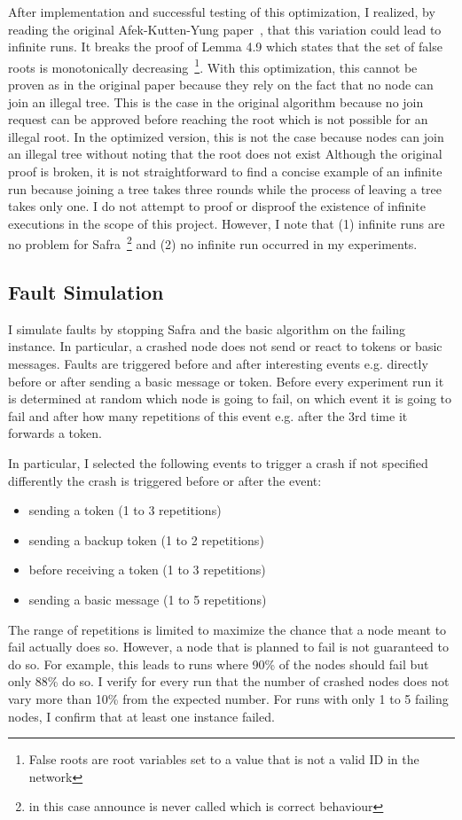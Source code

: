 After implementation and successful testing of this optimization, I realized, by reading the original Afek-Kutten-Yung paper~\cite{afek}, that this variation could lead to infinite runs.
It breaks the proof of Lemma 4.9 which states that the set of false roots is monotonically decreasing~\footnote{False roots are root variables set to a value that is not a valid ID in the network}.
With this optimization, this cannot be proven as in the original paper because they rely on the fact that no node can join an illegal tree.
This is the case in the original algorithm because no join request can be approved before reaching the root which is not possible for an illegal root.
In the optimized version, this is not the case because nodes can join an illegal tree without noting that the root does not exist
Although the original proof is broken, it is not straightforward to find a concise example of an infinite run because joining a tree takes three rounds while the process of leaving a tree takes only one.
I do not attempt to proof or disproof the existence of infinite executions in the scope of this project.
However, I note that (1) infinite runs are no problem for Safra~\footnote{in this case announce is never called which is correct behaviour} and (2) no infinite run occurred in my experiments.

\subsection{Fault Simulation}
I simulate faults by stopping Safra and the basic algorithm on the failing instance.
In particular, a crashed node does not send or react to tokens or basic messages.
Faults are triggered before and after interesting events e.g. directly before or after sending a basic message or token.
Before every experiment run it is determined at random which node is going to fail, on which event it is going to fail and after how many repetitions of this event e.g. after the 3rd time it forwards a token.

In particular, I selected the following events to trigger a crash if not specified differently the crash is triggered before or after the event:
\begin{itemize}
    \item sending a token (1 to 3 repetitions)
    \item sending a backup token (1 to 2 repetitions)
    \item before receiving a token (1 to 3 repetitions)
    \item sending a basic message (1 to 5 repetitions)
\end{itemize}
The range of repetitions is limited to maximize the chance that a node meant to fail actually does so.
However, a node that is planned to fail is not guaranteed to do so.
For example, this leads to runs where 90\% of the nodes should fail but only 88\% do so.
I verify for every run that the number of crashed nodes does not vary more than 10\% from the expected number. For runs with only 1 to 5 failing nodes, I confirm that at least one instance failed.

